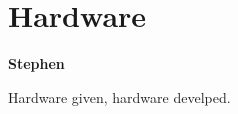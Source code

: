 \section{Hardware} %
\label{sec:mr_hardware}

\textbf{Stephen}

Hardware given, hardware develped.

